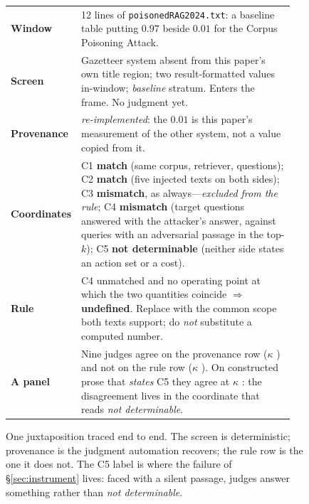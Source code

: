 \begin{figure}[t]
\centering\scriptsize
\setlength{\tabcolsep}{3pt}
\renewcommand{\arraystretch}{1.0}
\begin{tabular}{@{}p{0.180\linewidth}p{0.765\linewidth}@{}}
\toprule
\textbf{Window} & 12 lines of \texttt{poisonedRAG2024.txt}: a baseline table
putting $0.97$ beside $0.01$ for the Corpus Poisoning Attack. \\
\textbf{Screen} & Gazetteer system absent from this paper's own title region;
two result-formatted values in-window; \emph{baseline} stratum. Enters the
frame. No judgment yet. \\
\textbf{Provenance} & \emph{re-implemented}: the $0.01$ is this paper's
measurement of the other system, not a value copied from it. \\
\midrule
\textbf{Coordinates} & C1 \textbf{match} (same corpus, retriever, questions);
C2 \textbf{match} (five injected texts on both sides); C3 \textbf{mismatch}, as
always---\emph{excluded from the rule}; C4 \textbf{mismatch} (target questions
answered with the attacker's answer, against queries with an adversarial passage
in the top-$k$); C5 \textbf{not determinable} (neither side states an action set
or a cost). \\
\textbf{Rule} & C4 unmatched and no operating point at which the two quantities
coincide $\Rightarrow$ \textbf{undefined}. Replace with the common scope both
texts support; do \emph{not} substitute a computed number. \\
\midrule
\textbf{A panel} & Nine judges agree on the provenance row ($\kappa$
\DecProvK{}) and not on the rule row ($\kappa$ \DecVerdictK{}). On constructed
prose that \emph{states} C5 they agree at $\kappa$ \InsFullK{}: the disagreement
lives in the coordinate that reads \emph{not determinable}. \\
\bottomrule
\end{tabular}
\caption{One juxtaposition traced end to end. The screen is deterministic;
provenance is the judgment automation recovers; the rule row is the one it does
not. The C5 label is where the failure of \S\ref{sec:instrument} lives: faced
with a silent passage, judges answer something rather than \emph{not
determinable}.}
\label{fig:worked-example}
\end{figure}
